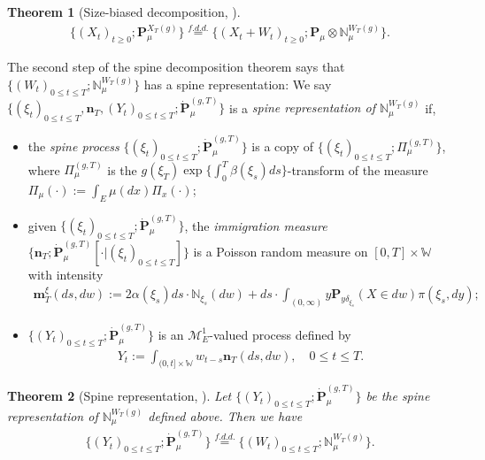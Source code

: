 \documentclass[UTF8]{pkuthss}
\theoremstyle{plain}
\newtheorem{thm}{Theorem}[section]
\theoremstyle{definition}
\numberwithin{equation}{section}
\begin{document}
\begin{thm}[Size-biased decomposition,  \cite{RenSongSun2017Spine}]\label{thm: size-biased decomposition}
\begin{align}
	\{(X_t)_{t\geq 0}; \mathbf P_\mu^{X_T(g)}\}
	\overset{f.d.d.}{=} \{(X_t+W_t)_{t\geq 0}; \mathbf P_\mu  \otimes \mathbb N^{W_T(g)}_\mu\}.
\end{align}
\end{thm}
	The second step of the spine decomposition theorem
	says that $\{(W_t)_{0\leq t\leq T}; \mathbb N^{W_T(g)}_\mu\}$ has a spine representation:
	We say $\{(\xi_t)_{0\leq t\leq T}, \mathbf n_T,  (Y_t)_{ 0\leq t\leq T}; \dot {\mathbf P}^{(g,T)}_\mu\}$ is a \emph{spine representation of $\mathbb N^{W_T(g)}_\mu$}  if,
\begin{itemize}
\item
	the \emph{spine process} $\{(\xi_t)_{0\leq t\leq T}; \dot{\mathbf P}^{(g,T)}_\mu\}$ is a copy of $\{(\xi_t)_{0\leq t\leq T}; \Pi^{(g,T)}_{\mu}\}$, 
	where $\Pi^{(g,T)}_{\mu}$ is the $g(\xi_T) \exp\{\int_0^T \beta(\xi_s)ds\}$-transform
	of the measure $\Pi_{\mu}(\cdot):=\int_{E}\mu(dx)\Pi_x(\cdot) $;
\item
	given $\{(\xi_t)_{0\leq t\leq T}; \dot{\mathbf P}^{(g,T)}_\mu\}$, the \emph{immigration measure} $\{\mathbf n_T; \dot{\mathbf P}^{(g,T)}_\mu[\cdot |(\xi_t)_{0\leq t\leq T}]\}$ is a Poisson random measure on $[0,T] \times \mathbb W$ with intensity
\begin{align}
	\mathbf m^\xi_T(ds,dw)
	:= 2 \alpha(\xi_s) ds \cdot \mathbb N_{\xi_s}(dw) + ds \cdot \int_{(0,\infty)} y \mathbf P_{y\delta_{\xi_s}}(X\in dw) \pi(\xi_s,dy);
\end{align}
\item
	$\{(Y_t)_{0\leq t\leq T}; \dot{\mathbf P}^{(g,T)}_\mu\}$ is an $\mathcal M^1_E$-valued process defined by
\begin{align}
	Y_t
	:= \int_{(0,t] \times \mathbb W} w_{t-s} \mathbf n_T(ds,dw),
	\quad 0 \leq t\leq T.
\end{align}
\end{itemize}

\begin{thm}[Spine representation, \cite{RenSongSun2017Spine}]\label{thm: spine representation}
	Let $\{(Y_t)_{0\leq t\leq T}; \dot {\mathbf P}^{(g,T)}_\mu\}$ be the spine representation of $\mathbb N^{W_T(g)}_\mu$ defined above.
	Then we have
\begin{align}
	\{(Y_t)_{0\leq t\leq T}; \dot{\mathbf P}^{(g,T)}_\mu\}
	\overset{f.d.d.}{=} \{(W_t)_{0\leq t\leq T}; \mathbb N_\mu^{W_T(g)}\}.
\end{align}
\end{thm}
\end{document}
